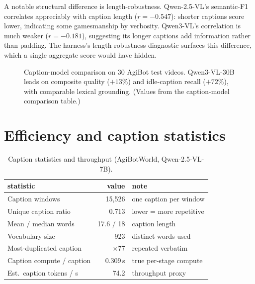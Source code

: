 \documentclass[10pt,letterpaper]{article}
\begin{document}
A notable structural difference is length-robustness. Qwen-2.5-VL's semantic-F1 correlates
appreciably with caption length ($r = -0.547$): shorter captions score lower, indicating some
gamesmanship by verbosity. Qwen3-VL's correlation is much weaker ($r = -0.181$), suggesting its
longer captions add information rather than padding. The harness's length-robustness diagnostic
surfaces this difference, which a single aggregate score would have hidden.

\begin{figure}[H]
\centering
{}
\caption{Caption-model comparison on 30 AgiBot test videos. Qwen3-VL-30B leads on composite
quality ($+13\%$) and idle-caption recall ($+72\%$), with comparable lexical grounding. (Values
from the caption-model comparison table.)}
\end{figure}

\section{Efficiency and caption statistics}

\begin{table}[H]
\centering
\caption{Caption statistics and throughput (AgiBotWorld, Qwen-2.5-VL-7B).}
\begin{tabular}{lr l}
\toprule
statistic & value & note \\
\midrule
Caption windows         & 15{,}526 & one caption per window \\
Unique caption ratio    & 0.713 & lower = more repetitive \\
Mean / median words     & 17.6 / 18 & caption length \\
Vocabulary size         & 923 & distinct words used \\
Most-duplicated caption & $\times$77 & repeated verbatim \\
Caption compute / caption & 0.309\,s & true per-stage compute \\
Est.\ caption tokens / s & 74.2 & throughput proxy \\
\bottomrule
\end{tabular}
\end{table}
\end{document}
